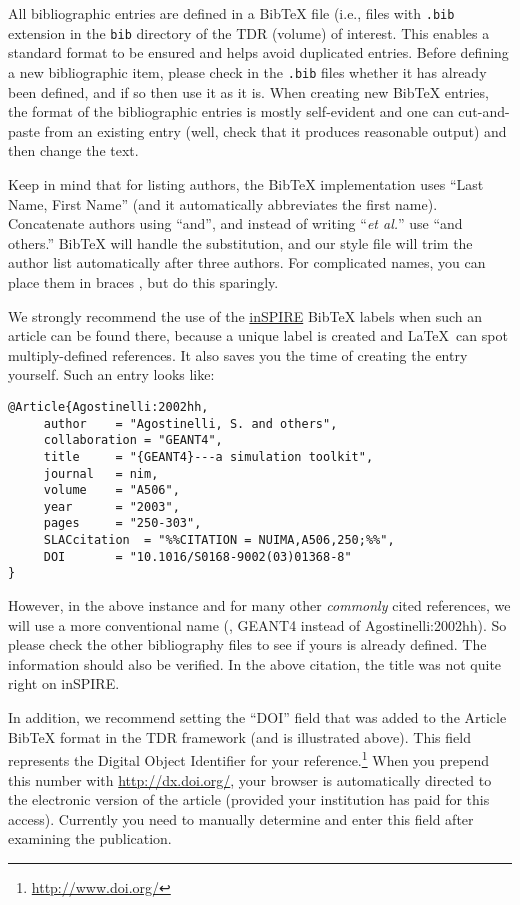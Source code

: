 All bibliographic entries are defined in a BibTeX file
(i.e., files with \texttt{.bib} extension in the \texttt{bib} directory
of the TDR (volume) of interest.
This enables a standard format to be ensured and helps avoid
duplicated entries.
Before defining a new bibliographic item, please check in the
\texttt{.bib} files whether it has already been defined, and if so
then use it as it is. When creating new BibTeX entries, the format of
the bibliographic entries is mostly self-evident and one can
cut-and-paste from an existing entry (well, check that it produces
reasonable output) and then change the text.

Keep in mind that for listing authors, the BibTeX implementation uses
``Last Name, First Name'' (and it automatically abbreviates the first
name). Concatenate authors using ``and'', and instead of writing
``\emph{et al.}'' use ``and others.'' BibTeX will handle the substitution,
and our style file will trim the author list automatically after three authors. For
complicated names, you can place them in braces ${}$, but do this
sparingly.


We strongly recommend the use of the \href{http://inspirehep.net}{inSPIRE} BibTeX labels when such an
article can be found there, because a unique label is created and
\LaTeX\ can spot multiply-defined references. It also saves you the time
of creating the entry yourself. Such an entry looks like:

\begin{verbatim}
@Article{Agostinelli:2002hh,
     author    = "Agostinelli, S. and others",
     collaboration = "GEANT4",
     title     = "{GEANT4}---a simulation toolkit",
     journal   = nim,
     volume    = "A506",
     year      = "2003",
     pages     = "250-303",
     SLACcitation  = "%%CITATION = NUIMA,A506,250;%%",
     DOI       = "10.1016/S0168-9002(03)01368-8"
}
\end{verbatim}

However, in the above instance and for many other \emph{commonly} cited
references, we will use a more conventional name (\eg,
GEANT4 instead of Agostinelli:2002hh). So please check the other bibliography files to see if yours
is already defined. The information should also be verified. In the above citation, the title was not quite right on inSPIRE.

In addition, we recommend setting the ``DOI'' field that was added to
the Article BibTeX format in the TDR framework (and is illustrated
above). This field represents
the Digital Object
Identifier for your reference.\footnote{\url{http://www.doi.org/}}
When you prepend this number with \url{http://dx.doi.org/}, your
browser is automatically directed to the electronic version of the
article (provided your institution has paid for this access). Currently
you need to manually determine and enter this field after examining the
publication.

